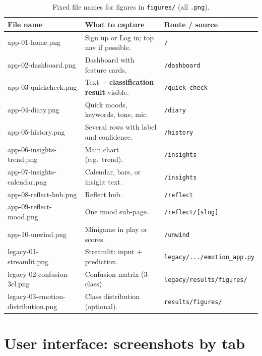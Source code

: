 \documentclass[11pt,a4paper]{article}
\begin{document}
\begin{table}[H]
  \centering
  \footnotesize
  \setlength{\tabcolsep}{3pt}
  \renewcommand{\arraystretch}{1.2}
  \begin{tabularx}{\textwidth}{@{}>{\ttfamily}l >{\raggedright\arraybackslash}X >{\raggedright\arraybackslash}X@{}}
    \toprule
    \normalfont\textbf{File name} & \textbf{What to capture} & \textbf{Route / source} \\
    \midrule
    app-01-home.png & Sign up or Log in; top nav if possible. & \texttt{/} \\
    app-02-dashboard.png & Dashboard with feature cards. & \texttt{/dashboard} \\
    app-03-quickcheck.png & Text + \textbf{classification result} visible. & \texttt{/quick-check} \\
    app-04-diary.png & Quick moods, keywords, tone, mic. & \texttt{/diary} \\
    app-05-history.png & Several rows with label and confidence. & \texttt{/history} \\
    app-06-insights-trend.png & Main chart (e.g.\ trend). & \texttt{/insights} \\
    app-07-insights-calendar.png & Calendar, bars, or insight text. & \texttt{/insights} \\
    app-08-reflect-hub.png & Reflect hub. & \texttt{/reflect} \\
    app-09-reflect-mood.png & One mood sub-page. & \texttt{/reflect/[slug]} \\
    app-10-unwind.png & Minigame in play or scores. & \texttt{/unwind} \\
    \midrule
    legacy-01-streamlit.png & Streamlit: input + prediction. & \texttt{legacy/.../emotion\_app.py} \\
    legacy-02-confusion-3cl.png & Confusion matrix (3-class). & \texttt{legacy/results/figures/} \\
    legacy-03-emotion-distribution.png & Class distribution (optional). & \texttt{results/figures/} \\
    \bottomrule
  \end{tabularx}
  \caption{Fixed file names for figures in \texttt{figures/} (all \texttt{.png}).}
  \label{tab:figure-files}
\end{table}

\section{User interface: screenshots by tab}
\label{sec:ui-figs}
\end{document}
